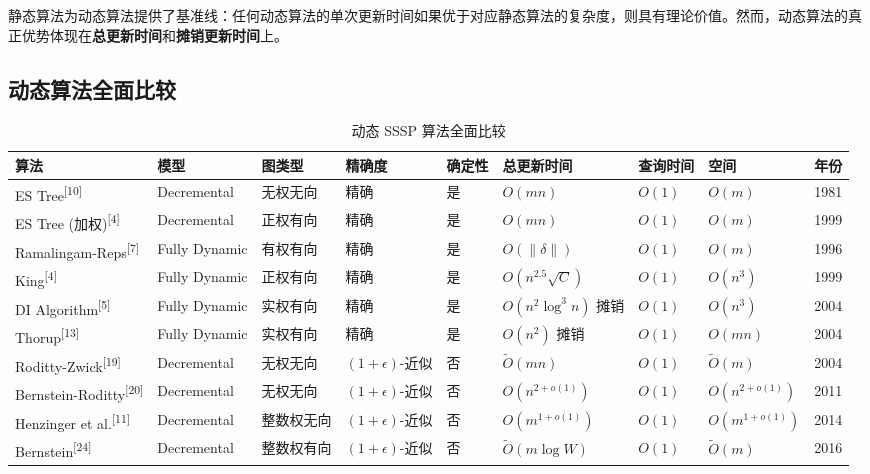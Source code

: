 \documentclass[12pt,a4paper]{ctexart}
\begin{document}
静态算法为动态算法提供了基准线：任何动态算法的单次更新时间如果优于对应静态算法的复杂度，则具有理论价值。然而，动态算法的真正优势体现在\textbf{总更新时间}和\textbf{摊销更新时间}上。

\subsection{动态算法全面比较}

\begin{landscape}
\begin{table}[H]
\centering
\caption{动态 SSSP 算法全面比较}
\label{tab:comparison}
\scriptsize
\setlength{\tabcolsep}{3pt}
\begin{tabular}{|p{2.7cm}|p{2.2cm}|p{1.8cm}|p{2.0cm}|p{0.9cm}|p{6.0cm}|p{1.4cm}|p{2.0cm}|p{0.9cm}|}
\toprule
\textbf{算法} & \textbf{模型} & \textbf{图类型} & \textbf{精确度} & \textbf{确定性} & \textbf{总更新时间} & \textbf{查询时间} & \textbf{空间} & \textbf{年份} \\
\midrule
ES Tree\textsuperscript{[10]} & Decremental & 无权无向 & 精确 & 是 & $O(mn)$ & $O(1)$ & $O(m)$ & 1981 \\
ES Tree (加权)\textsuperscript{[4]} & Decremental & 正权有向 & 精确 & 是 & $O(mn)$ & $O(1)$ & $O(m)$ & 1999 \\
Ramalingam-Reps\textsuperscript{[7]} & Fully Dynamic & 有权有向 & 精确 & 是 & $O(\|\delta\|)$ & $O(1)$ & $O(m)$ & 1996 \\
King\textsuperscript{[4]} & Fully Dynamic & 正权有向 & 精确 & 是 & $O(n^{2.5}\sqrt{C})$ & $O(1)$ & $O(n^3)$ & 1999 \\
DI Algorithm\textsuperscript{[5]} & Fully Dynamic & 实权有向 & 精确 & 是 & $O(n^2\log^3 n)$ 摊销 & $O(1)$ & $O(n^3)$ & 2004 \\
Thorup\textsuperscript{[13]} & Fully Dynamic & 实权有向 & 精确 & 是 & $O(n^2)$ 摊销 & $O(1)$ & $O(mn)$ & 2004 \\
Roditty-Zwick\textsuperscript{[19]} & Decremental & 无权无向 & $(1+\epsilon)$-近似 & 否 & $\tilde{O}(mn)$ & $O(1)$ & $\tilde{O}(m)$ & 2004 \\
Bernstein-Roditty\textsuperscript{[20]} & Decremental & 无权无向 & $(1+\epsilon)$-近似 & 否 & $O(n^{2+o(1)})$ & $O(1)$ & $O(n^{2+o(1)})$ & 2011 \\
Henzinger et al.\textsuperscript{[11]} & Decremental & 整数权无向 & $(1+\epsilon)$-近似 & 否 & $O(m^{1+o(1)})$ & $O(1)$ & $O(m^{1+o(1)})$ & 2014 \\
Bernstein\textsuperscript{[24]} & Decremental & 整数权有向 & $(1+\epsilon)$-近似 & 否 & $\tilde{O}(m\log W)$ & $O(1)$ & $\tilde{O}(m)$ & 2016 \\

\end{tabular}
\end{table}
\end{landscape}
\end{document}
